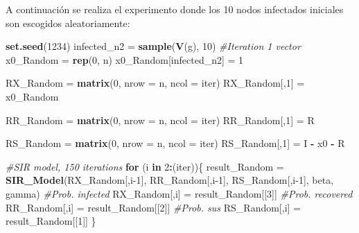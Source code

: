 \documentclass[
]{article}
\newenvironment{Shaded}{\begin{snugshade}}{\end{snugshade}}
\newcommand{\CommentTok}[1]{\textcolor[rgb]{0.56,0.35,0.01}{\textit{#1}}}
\newcommand{\ControlFlowTok}[1]{\textcolor[rgb]{0.13,0.29,0.53}{\textbf{#1}}}
\newcommand{\DataTypeTok}[1]{\textcolor[rgb]{0.13,0.29,0.53}{#1}}
\newcommand{\DecValTok}[1]{\textcolor[rgb]{0.00,0.00,0.81}{#1}}
\newcommand{\KeywordTok}[1]{\textcolor[rgb]{0.13,0.29,0.53}{\textbf{#1}}}
\newcommand{\NormalTok}[1]{#1}
\newcommand{\OperatorTok}[1]{\textcolor[rgb]{0.81,0.36,0.00}{\textbf{#1}}}
\newcommand{\StringTok}[1]{\textcolor[rgb]{0.31,0.60,0.02}{#1}}
\begin{document}
A continuación se realiza el experimento donde los 10 nodos infectados
iniciales son escogidos aleatoriamente:

\begin{Shaded}
\begin{Highlighting}[]
\KeywordTok{set.seed}\NormalTok{(}\DecValTok{1234}\NormalTok{)}
\NormalTok{infected\_n2 =}\StringTok{ }\KeywordTok{sample}\NormalTok{(}\KeywordTok{V}\NormalTok{(g), }\DecValTok{10}\NormalTok{)}
\CommentTok{\#Iteration 1 vector}
\NormalTok{x0\_Random =}\StringTok{ }\KeywordTok{rep}\NormalTok{(}\DecValTok{0}\NormalTok{, n)}
\NormalTok{x0\_Random[infected\_n2] =}\StringTok{ }\DecValTok{1}

\NormalTok{RX\_Random =}\StringTok{ }\KeywordTok{matrix}\NormalTok{(}\DecValTok{0}\NormalTok{, }\DataTypeTok{nrow =}\NormalTok{ n, }\DataTypeTok{ncol =}\NormalTok{ iter)}
\NormalTok{RX\_Random[,}\DecValTok{1}\NormalTok{] =}\StringTok{ }\NormalTok{x0\_Random}

\NormalTok{RR\_Random =}\StringTok{ }\KeywordTok{matrix}\NormalTok{(}\DecValTok{0}\NormalTok{, }\DataTypeTok{nrow =}\NormalTok{ n, }\DataTypeTok{ncol =}\NormalTok{ iter)}
\NormalTok{RR\_Random[,}\DecValTok{1}\NormalTok{] =}\StringTok{ }\NormalTok{R}

\NormalTok{RS\_Random =}\StringTok{ }\KeywordTok{matrix}\NormalTok{(}\DecValTok{0}\NormalTok{, }\DataTypeTok{nrow =}\NormalTok{ n, }\DataTypeTok{ncol =}\NormalTok{ iter)}
\NormalTok{RS\_Random[,}\DecValTok{1}\NormalTok{] =}\StringTok{ }\NormalTok{I }\OperatorTok{{-}}\StringTok{ }\NormalTok{x0 }\OperatorTok{{-}}\StringTok{ }\NormalTok{R }

\CommentTok{\#SIR model, 150 iterations}
\ControlFlowTok{for}\NormalTok{ (i }\ControlFlowTok{in} \DecValTok{2}\OperatorTok{:}\NormalTok{(iter))\{}
\NormalTok{  result\_Random =}\StringTok{ }\KeywordTok{SIR\_Model}\NormalTok{(RX\_Random[,i}\DecValTok{{-}1}\NormalTok{], RR\_Random[,i}\DecValTok{{-}1}\NormalTok{], RS\_Random[,i}\DecValTok{{-}1}\NormalTok{], beta, gamma)}
  \CommentTok{\#Prob. infected}
\NormalTok{  RX\_Random[,i] =}\StringTok{ }\NormalTok{result\_Random[[}\DecValTok{3}\NormalTok{]]}
  \CommentTok{\#Prob. recovered}
\NormalTok{  RR\_Random[,i] =}\StringTok{ }\NormalTok{result\_Random[[}\DecValTok{2}\NormalTok{]]}
  \CommentTok{\#Prob. sus}
\NormalTok{  RS\_Random[,i] =}\StringTok{ }\NormalTok{result\_Random[[}\DecValTok{1}\NormalTok{]]}
\NormalTok{\}}
\end{Highlighting}
\end{Shaded}
\end{document}
